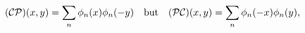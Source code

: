 \begin{equation}
({\cal CP})(x,y)=\sum_n\phi_n(x)\phi_n(-y)\quad{\rm but}\quad
({\cal PC})(x,y)= \sum_n\phi_n(-x)\phi_n(y), \label{e17}
\end{equation}

